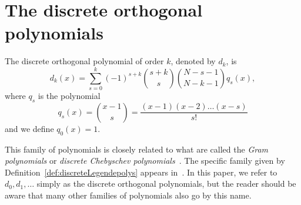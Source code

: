\documentclass[review]{elsarticle}
\begin{document}

\section{The discrete orthogonal polynomials}\label{sec:discr-orth-polyn}

\begin{definition}  \label{def:discreteLegendepolys}
The discrete orthogonal polynomial of order $k$, denoted by $d_k$, is
\[
d_k(x) = \sum_{s=0}^k{(-1)^{s+k}\binom{s+k}{s}\binom{N-s-1}{N-k-1}q_s(x)},
\]
where $q_s$ is the polynomial
\[
q_s(x) = \binom{x-1}{s} = \frac{(x-1)(x-2)\dots(x-s)}{s!}
\]
and we define $q_0(x) = 1$.
\end{definition}
This family of polynomials is closely related to what are called the \emph{Gram polynomials} or \emph{discrete Chebyschev polynomials}~\cite[p. 323]{Bjork_num_methods_least_square_1996}\cite{Chebyshev_discrete_polys1864,Gram_discrete_polys1883}.  The specific family given by Definition~\ref{def:discreteLegendepolys} appears in~\cite{Eisinberg2007_discerete_otho_poly_equidist}.  In this paper, we refer to $d_0,d_1,\dots$ simply as the discrete orthogonal polynomials, but the reader should be aware that many other families of polynomials also go by this name.  
\end{document}
